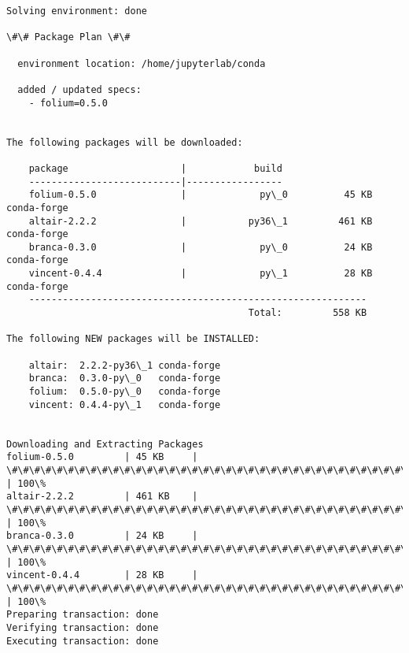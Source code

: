 \documentclass[11pt]{article}
\begin{document}
    \begin{Verbatim}[commandchars=\\\{\}]
Solving environment: done

\#\# Package Plan \#\#

  environment location: /home/jupyterlab/conda

  added / updated specs: 
    - folium=0.5.0


The following packages will be downloaded:

    package                    |            build
    ---------------------------|-----------------
    folium-0.5.0               |             py\_0          45 KB  conda-forge
    altair-2.2.2               |           py36\_1         461 KB  conda-forge
    branca-0.3.0               |             py\_0          24 KB  conda-forge
    vincent-0.4.4              |             py\_1          28 KB  conda-forge
    ------------------------------------------------------------
                                           Total:         558 KB

The following NEW packages will be INSTALLED:

    altair:  2.2.2-py36\_1 conda-forge
    branca:  0.3.0-py\_0   conda-forge
    folium:  0.5.0-py\_0   conda-forge
    vincent: 0.4.4-py\_1   conda-forge


Downloading and Extracting Packages
folium-0.5.0         | 45 KB     | \#\#\#\#\#\#\#\#\#\#\#\#\#\#\#\#\#\#\#\#\#\#\#\#\#\#\#\#\#\#\#\#\#\#\#\#\# | 100\% 
altair-2.2.2         | 461 KB    | \#\#\#\#\#\#\#\#\#\#\#\#\#\#\#\#\#\#\#\#\#\#\#\#\#\#\#\#\#\#\#\#\#\#\#\#\# | 100\% 
branca-0.3.0         | 24 KB     | \#\#\#\#\#\#\#\#\#\#\#\#\#\#\#\#\#\#\#\#\#\#\#\#\#\#\#\#\#\#\#\#\#\#\#\#\# | 100\% 
vincent-0.4.4        | 28 KB     | \#\#\#\#\#\#\#\#\#\#\#\#\#\#\#\#\#\#\#\#\#\#\#\#\#\#\#\#\#\#\#\#\#\#\#\#\# | 100\% 
Preparing transaction: done
Verifying transaction: done
Executing transaction: done

    \end{Verbatim}
\end{document}
